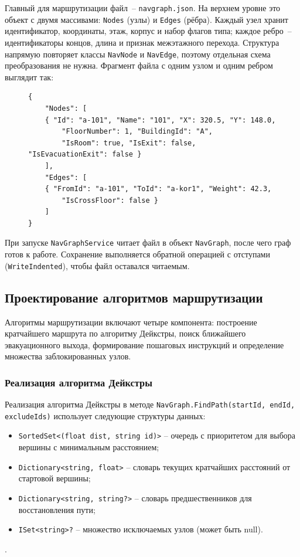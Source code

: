 Главный для маршрутизации файл~-- \texttt{navgraph.json}. На верхнем уровне это объект с двумя массивами: \texttt{Nodes} (узлы) и \texttt{Edges} (рёбра). Каждый узел хранит идентификатор, координаты, этаж, корпус и набор флагов типа; каждое ребро~-- идентификаторы концов, длина и признак межэтажного перехода. Структура напрямую повторяет классы \texttt{NavNode} и \texttt{NavEdge}, поэтому отдельная схема преобразования не нужна. Фрагмент файла с одним узлом и одним ребром выглядит так:

\newpage
\begin{figure}[H] 
\begin{lstlisting}
{
	"Nodes": [
	{ "Id": "a-101", "Name": "101", "X": 320.5, "Y": 148.0,
		"FloorNumber": 1, "BuildingId": "A",
		"IsRoom": true, "IsExit": false, "IsEvacuationExit": false }
	],
	"Edges": [
	{ "FromId": "a-101", "ToId": "a-kor1", "Weight": 42.3,
		"IsCrossFloor": false }
	]
}
\end{lstlisting}
\end{figure}

При запуске \texttt{NavGraphService} читает файл в объект \texttt{NavGraph}, после чего граф готов к работе. Сохранение выполняется обратной операцией с отступами (\texttt{WriteIndented}), чтобы файл оставался читаемым.

\subsection{Проектирование алгоритмов маршрутизации}

Алгоритмы маршрутизации включают четыре компонента: построение кратчайшего маршрута по алгоритму Дейкстры, поиск ближайшего эвакуационного выхода, формирование пошаговых инструкций и определение множества заблокированных узлов.

\subsubsection{Реализация алгоритма Дейкстры}

Реализация алгоритма Дейкстры в методе \texttt{NavGraph.FindPath(startId, endId, excludeIds)} использует следующие структуры данных:
\begin{itemize}
\item \texttt{SortedSet<(float dist, string id)>} -- очередь с приоритетом для выбора вершины с минимальным расстоянием;
\item \texttt{Dictionary<string, float>} -- словарь текущих кратчайших расстояний от стартовой вершины;
\item \texttt{Dictionary<string, string?>} -- словарь предшественников для восстановления пути;
\item \texttt{ISet<string>?} -- множество исключаемых узлов (может быть null).
\end{itemize}.

